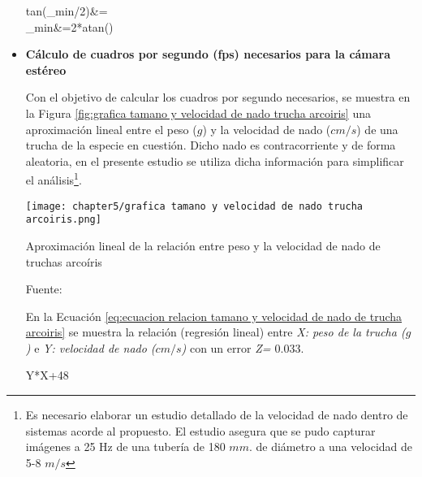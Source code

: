 \begin{itemize}
	\begin{myequation}\label{eq:calculo beta de distancia entre espejos y camara estereo}
		\begin{split}
			tan(\beta_{min}/2)&=\\
			\beta_{min}&=2*atan()\\
		\end{split}		
	\end{myequation}

	\item \textbf{Cálculo de cuadros por segundo (fps) necesarios para la cámara estéreo}
	
	Con el objetivo de calcular los cuadros por segundo necesarios, se muestra en la Figura \ref{fig:grafica tamano y velocidad de nado trucha arcoiris} una aproximación lineal entre el peso ($g$) y la velocidad de nado ($cm/s$) de una trucha de la especie en cuestión. Dicho nado es contracorriente y de forma aleatoria, en el presente estudio se utiliza dicha información para simplificar el análisis\footnote{Es necesario elaborar un estudio detallado de la velocidad de nado dentro de sistemas acorde al propuesto. El estudio  \cite{Borisovich2016} asegura que se pudo capturar imágenes a 25 Hz de una tubería de 180 $mm.$ de diámetro a una velocidad de 5-8 $m/s$}.
	
	\begin{myfigure}[H]
		\footnotesize\centering
		\texttt{[image: chapter5/grafica tamano y velocidad de nado trucha arcoiris.png]}
		\caption{Aproximación lineal de la relación entre peso y la velocidad de nado de truchas arcoíris}
		\begin{myflushcenter}
			Fuente: \cite{Fry1970}
		\end{myflushcenter}
		\label{fig:grafica tamano y velocidad de nado trucha arcoiris}
	\end{myfigure}	
	
	En la Ecuación \ref{eq:ecuacion relacion tamano y velocidad de nado de trucha arcoiris} se muestra la relación (regresión lineal) entre \textit{X: peso de la trucha ($g$)} e \textit{Y: velocidad de nado ($cm/s$)} con un error \textit{Z= $0.033$}. 
	
	\begin{myequation} \label{eq:ecuacion relacion tamano y velocidad de nado de trucha arcoiris}
		Y*X+48
	\end{myequation}
	

\end{itemize}
